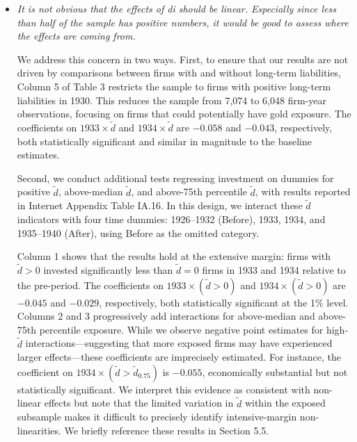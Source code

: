 \begin{itemize}
    \bigskip

    \noindent We are now reporting standard errors in all tables.
    
    \item[\textit{\textcolor{red!60!black}{f.}}] \textit{\textcolor{red!60!black}{
    It is not obvious that the effects of di should be linear. Especially since less than half of the sample has positive numbers, it would be good to assess where the effects are coming from.
    }}

    \bigskip

    \noindent We address this concern in two ways. First, to ensure that our results are not driven by comparisons between firms with and without long-term liabilities, Column 5 of Table 3 restricts the sample to firms with positive long-term liabilities in 1930. This reduces the sample from 7,074 to 6,048 firm-year observations, focusing on firms that could potentially have gold exposure. The coefficients on $1933 \times \tilde{d}$ and $1934 \times \tilde{d}$ are $-0.058$ and $-0.043$, respectively, both statistically significant and similar in magnitude to the baseline estimates.
    
    Second, we conduct additional tests regressing investment on dummies for positive $\tilde{d}$, above-median $\tilde{d}$, and above-75th percentile $\tilde{d}$, with results reported in Internet Appendix Table IA.16. In this design, we interact these $\tilde{d}$ indicators with four time dummies: 1926--1932 (Before), 1933, 1934, and 1935--1940 (After), using Before as the omitted category. 
    
    Column 1 shows that the results hold at the extensive margin: firms with $\tilde{d}>0$ invested significantly less than $\tilde{d}=0$ firms in 1933 and 1934 relative to the pre-period. The coefficients on $1933 \times (\tilde{d}>0)$ and $1934 \times (\tilde{d}>0)$ are $-0.045$ and $-0.029$, respectively, both statistically significant at the 1\% level. Columns 2 and 3 progressively add interactions for above-median and above-75th percentile exposure. While we observe negative point estimates for high-$\tilde{d}$ interactions---suggesting that more exposed firms may have experienced larger effects---these coefficients are imprecisely estimated. For instance, the coefficient on $1934 \times (\tilde{d} > \tilde{d}_{0.75})$ is $-0.055$, economically substantial but not statistically significant. We interpret this evidence as consistent with non-linear effects but note that the limited variation in $\tilde{d}$ within the exposed subsample makes it difficult to precisely identify intensive-margin non-linearities. We briefly reference these results in Section 5.5.


\end{itemize}
